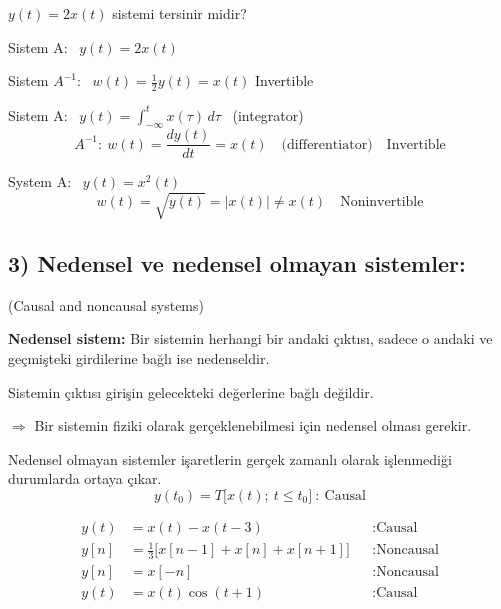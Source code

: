\documentclass[11pt,a4paper]{article}
\begin{document}
\begin{ornek}[(Ex)]
$y(t) = 2x(t)$ sistemi tersinir midir?
\begin{center}
\end{center}
Sistem A: \ $y(t) = 2x(t)$

Sistem $A^{-1}$: \ $w(t) = \frac{1}{2}y(t) = x(t)$ \quad Invertible
\end{ornek}

\begin{ornek}[(Ex)]
Sistem A: \ $y(t) = \displaystyle\int_{-\infty}^{t} x(\tau)\,d\tau$ \ (integrator)
\[ A^{-1}:\ w(t) = \frac{dy(t)}{dt} = x(t) \quad \text{(differentiator)} \quad \text{Invertible} \]
\end{ornek}

\begin{ornek}[(Ex)]
System A: \ $y(t) = x^2(t)$
\[ w(t) = \sqrt{y(t)} = |x(t)| \neq x(t) \quad \text{Noninvertible} \]
\end{ornek}

\subsection{3) Nedensel ve nedensel olmayan sistemler:}
(Causal and noncausal systems)

\textbf{Nedensel sistem:} Bir sistemin herhangi bir andaki çıktısı, sadece o andaki ve geçmişteki girdilerine bağlı ise nedenseldir.

Sistemin çıktısı girişin gelecekteki değerlerine bağlı değildir.

$\Rightarrow$ Bir sistemin fiziki olarak gerçeklenebilmesi için nedensel olması gerekir.

Nedensel olmayan sistemler işaretlerin gerçek zamanlı olarak işlenmediği durumlarda ortaya çıkar.
\[ y(t_0) = T\bigl[x(t);\ t \leq t_0\bigr] \ : \ \text{Causal} \]

\begin{ornek}[(Ex)]
\begin{align*}
  y(t) &= x(t) - x(t-3) &&: \text{Causal} \\
  y[n] &= \frac{1}{3}\bigl[x[n-1] + x[n] + x[n+1]\bigr] &&: \text{Noncausal} \\
  y[n] &= x[-n] &&: \text{Noncausal} \\
  y(t) &= x(t)\cos(t+1) &&: \text{Causal}
\end{align*}
\end{ornek}
\end{document}
